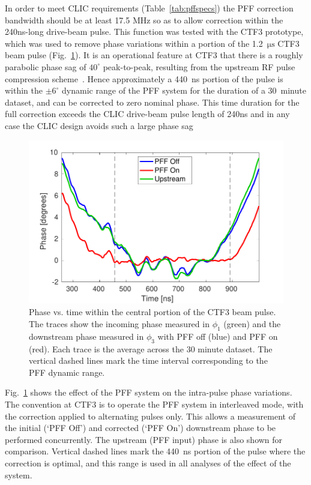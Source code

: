 \documentclass[%
 reprint,
 superscriptaddress,
 amsmath,
 amssymb,
 prl,
]{revtex4-1}
\begin{document}
In order to meet CLIC requirements (Table~\ref{tab:pffspecs}) the PFF 
correction bandwidth should be at least 17.5 MHz so as to allow correction 
within the 240ns-long drive-beam pulse. This function was tested with the CTF3 
prototype, which was used to remove phase variations within a portion of the 
1.2~\(\mathrm{\mu s}\) CTF3 beam pulse (Fig.~\ref{fig:shape}).  It is an 
operational feature at CTF3 that there is a roughly parabolic phase sag of 
\(40^\circ\) peak-to-peak, 
resulting from the upstream RF pulse compression scheme~\cite{CLICCDR}. Hence 
approximately a 440~ns portion of the pulse is within the \(\pm 6^\circ\) 
dynamic range of the PFF system for the duration of a 30~minute dataset, and 
can be corrected to zero nominal phase. 
This time duration for the full correction exceeds the CLIC drive-beam pulse 
length of 240ns and in any case the CLIC design avoids such 
a large phase sag~\cite{CLICCDR} 

\begin{figure}
	\includegraphics[width=\columnwidth]{figs/shape}
	\caption{\label{fig:shape}Phase vs. time within the central portion of the 
	CTF3 beam pulse. The traces show the incoming phase measured in \(\phi_1\) 
	(green) and the downstream phase measured in \(\phi_3\) with PFF off (blue) 
	and PFF on (red). Each trace is the average across the 30 minute dataset.
	The vertical dashed lines mark the time interval corresponding to the PFF 
	dynamic range. }
\end{figure}

Fig.~\ref{fig:shape} shows the effect of the PFF system on the intra-pulse 
phase variations. The convention at CTF3 is to 
operate the PFF system in interleaved mode, with 
the correction applied to alternating pulses only. This allows a measurement of 
the initial (`PFF Off') and corrected (`PFF On') downstream phase to be 
performed concurrently. The upstream (PFF input) phase is also shown for 
comparison. Vertical dashed lines mark the 440~ns portion of the pulse where 
the 
correction is optimal, and this range is used in all analyses of the 
effect of the system. 
\end{document}
